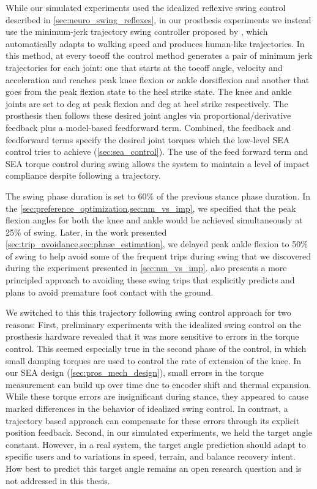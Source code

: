 While our simulated experiments used the idealized reflexive swing control
described in \cref{sec:neuro_swing_reflexes}, in our prosthesis experiments we
instead use the minimum-jerk trajectory swing controller proposed by
\citet{lenzi2014speed}, which automatically adapts to walking speed and produces
human-like trajectories. In this method, at every toeoff the control method
generates a pair of minimum jerk trajectories for each joint: one that starts at
the toeoff angle, velocity and acceleration and reaches peak knee flexion or
ankle dorsiflexion and another that goes from the peak flexion state to the heel
strike state. The knee and ankle joints are set to \unit[65 and 2]{deg} at peak
flexion and \unit[2 and -5]{deg} at heel strike respectively. The prosthesis
then follows these desired joint angles via proportional/derivative feedback
plus a model-based feedforward term. Combined, the feedback and feedforward
terms specify the desired joint torques which the low-level SEA control tries to
achieve (\cref{sec:sea_control}). The use of the feed forward term and SEA
torque control during swing allows the system to maintain a level of impact
compliance despite following a trajectory.

The swing phase duration is set to 60\% of the previous stance phase duration.
In the \cref{sec:preference_optimization,sec:nm_vs_imp}, we specified that the
peak flexion angles for both the knee and ankle would be achieved simultaneously
at 25\% of swing. Later, in the work presented
\cref{sec:trip_avoidance,sec:phase_estimation}, we delayed peak ankle flexion to
50\% of swing to help avoid some of the frequent trips during swing that we
discovered during the experiment presented in \cref{sec:nm_vs_imp}.
 also presents a more principled approach to avoiding
these swing trips that explicitly predicts and plans to avoid premature foot
contact with the ground.

We switched to this this trajectory following swing control approach for two
reasons: First, preliminary experiments with the idealized swing control on the
prosthesis hardware revealed that it was more sensitive to errors in the torque
control. This seemed especially true in the second phase of the control, in
which small damping torques are used to control the rate of extension of the
knee. In our SEA design (\cref{sec:pros_mech_design}), small errors in the torque
measurement can build up over time due to encoder shift and thermal expansion.
While these torque errors are insignificant during stance, they appeared to
cause marked differences in the behavior of idealized swing control. In
contrast, a trajectory based approach can compensate for these errors through
its explicit position feedback. Second, in our simulated experiments, we held
the target angle constant. However, in a real system, the target angle
prediction should adapt to specific users and to variations in speed, terrain,
and balance recovery intent. How best to predict this target angle remains an
open research question and is not addressed in this thesis.


